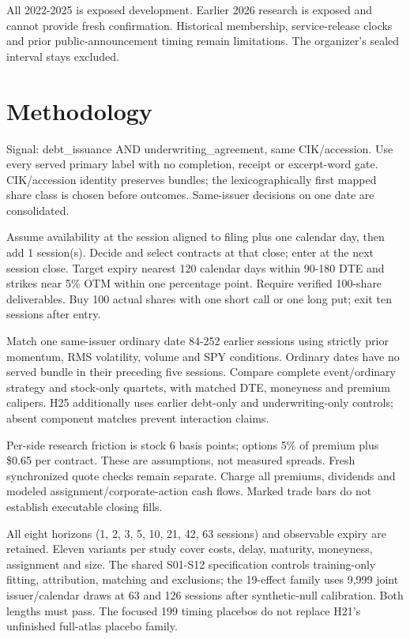 \documentclass[11pt,letterpaper]{article}
\begin{document}
All 2022-2025 is exposed development. Earlier 2026 research is exposed and cannot provide fresh confirmation. Historical membership, service-release clocks and prior public-announcement timing remain limitations. The organizer's sealed interval stays excluded.


\clearpage
\section{Methodology}
Signal: debt\_issuance AND underwriting\_agreement, same CIK/accession. Use every served primary label with no completion, receipt or excerpt-word gate. CIK/accession identity preserves bundles; the lexicographically first mapped share class is chosen before outcomes. Same-issuer decisions on one date are consolidated.

Assume availability at the session aligned to filing plus one calendar day, then add 1 session(s). Decide and select contracts at that close; enter at the next session close. Target expiry nearest 120 calendar days within 90-180 DTE and strikes near 5\% OTM within one percentage point. Require verified 100-share deliverables. Buy 100 actual shares with one short call or one long put; exit ten sessions after entry.

Match one same-issuer ordinary date 84-252 earlier sessions using strictly prior momentum, RMS volatility, volume and SPY conditions. Ordinary dates have no served bundle in their preceding five sessions. Compare complete event/ordinary strategy and stock-only quartets, with matched DTE, moneyness and premium calipers. H25 additionally uses earlier debt-only and underwriting-only controls; absent component matches prevent interaction claims.

Per-side research friction is stock 6 basis points; options 5\% of premium plus \$0.65 per contract. These are assumptions, not measured spreads. Fresh synchronized quote checks remain separate. Charge all premiums, dividends and modeled assignment/corporate-action cash flows. Marked trade bars do not establish executable closing fills.

All eight horizons (1, 2, 3, 5, 10, 21, 42, 63 sessions) and observable expiry are retained. Eleven variants per study cover costs, delay, maturity, moneyness, assignment and size. The shared S01-S12 specification controls training-only fitting, attribution, matching and exclusions; the 19-effect family uses 9,999 joint issuer/calendar draws at 63 and 126 sessions after synthetic-null calibration. Both lengths must pass. The focused 199 timing placebos do not replace H21's unfinished full-atlas placebo family.
\end{document}
